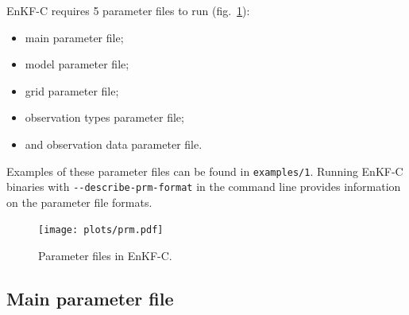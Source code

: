 \documentclass[11pt]{report}
\begin{document}
EnKF-C requires 5 parameter files to run (fig.~\ref{fig:prm}):
\begin{itemize} 
\item main parameter file;
\item model parameter file;
\item grid parameter file;
\item observation types parameter file;
\item and observation data parameter file.
\end{itemize}
Examples of these parameter files can be found in \verb|examples/1|.
Running EnKF-C binaries with \verb|--describe-prm-format| in the command line provides information on the parameter file formats.

\begin{figure}[h]
  \centering
  \texttt{[image: plots/prm.pdf]}
  \caption{Parameter files in EnKF-C.}
  \label{fig:prm}
\end{figure}

\subsection{Main parameter file}
\label{sec:mainprm}
\end{document}
